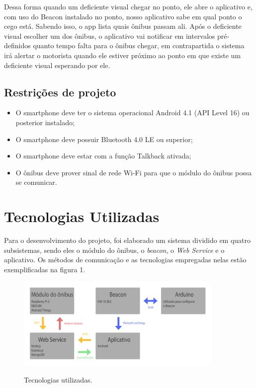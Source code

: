 \documentclass[
	12pt,				%
	oneside,			%
	a4paper,			%
	brazil				%
]{abntex2}
\begin{document}
Dessa forma quando um deficiente visual chegar no ponto, ele abre o aplicativo e, com uso do Beacon instalado no ponto, nosso aplicativo sabe em qual ponto o cego está. Sabendo isso, o app lista quais ônibus passam ali. Após o deficiente visual escolher um dos ônibus, o aplicativo vai notificar em intervalos pré-definidos quanto tempo falta para o ônibus chegar, em contrapartida o sistema irá alertar o motorista quando ele estiver próximo ao ponto em que existe um deficiente visual esperando por ele.

\section{Restrições de projeto}

\begin{itemize}
\item O smartphone deve ter o sistema operacional Android 4.1 (API Level 16) ou posterior instalado;
\item O smartphone deve possuir Bluetooth 4.0 LE ou superior;
\item O smartphone deve estar com a função Talkback ativada;
\item O ônibus deve prover sinal de rede Wi-Fi para que o módulo do ônibus possa se comunicar.
\end{itemize}

\chapter{Tecnologias Utilizadas}

Para o desenvolvimento do projeto, foi elaborado um sistema dividido em quatro subsistemas, sendo eles o módulo do ônibus, o \textit{beacon}, o \textit{Web Service} e o aplicativo. Os métodos de comunicação e as tecnologias empregadas nelas estão exemplificadas na figura 1. 

\begin{figure}[H]
\centering
\caption{Tecnologias utilizadas.}
\includegraphics[width=10cm, center]{images/tech}
\label{Rotulo}
\end{figure}
\end{document}
